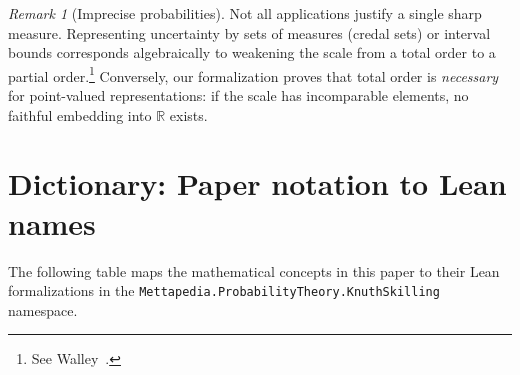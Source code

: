 \documentclass[11pt]{article}
\theoremstyle{definition}
\theoremstyle{remark}
\newtheorem{remark}[theorem]{Remark}
\begin{document}
\begin{remark}[Imprecise probabilities]
Not all applications justify a single sharp measure.  Representing uncertainty by sets of
measures (credal sets) or interval bounds corresponds algebraically to weakening the scale
from a total order to a partial order.\footnote{See Walley~\cite{Walley1991}.}
Conversely, our formalization proves that total order is \emph{necessary} for point-valued
representations: if the scale has incomparable elements, no faithful embedding into $\mathbb{R}$
exists.
\end{remark}

\appendix

\section{Dictionary: Paper notation to Lean names}

The following table maps the mathematical concepts in this paper to their Lean formalizations
in the \texttt{Mettapedia.ProbabilityTheory.KnuthSkilling} namespace.
\end{document}

